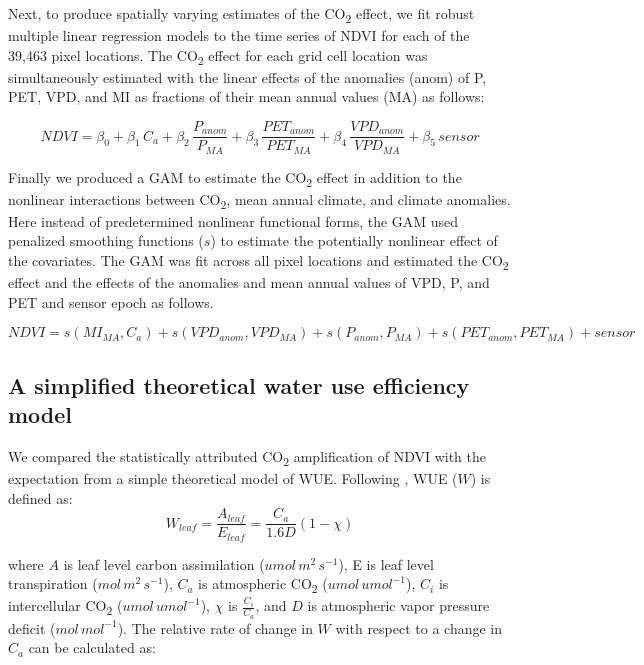 \documentclass[gc, manuscript]{copernicus}
\begin{document}
Next, to produce spatially varying estimates of the CO\textsubscript{2}
effect, we fit robust multiple linear regression models to the time
series of NDVI for each of the 39,463 pixel locations. The
CO\textsubscript{2} effect for each grid cell location was
simultaneously estimated with the linear effects of the anomalies (anom)
of P, PET, VPD, and MI as fractions of their mean annual values (MA) as
follows:

\begin{equation}
NDVI=\beta_0+ \beta_1\,C_{a}+\beta_2\,\frac{P_{anom}}{P_{MA}}+\beta_3\,\frac{PET_{anom}}{PET_{MA}}+\beta_4\,\frac{VPD_{anom}}{{VPD_{MA}}}+\beta_5\,sensor
\end{equation}

Finally we produced a GAM to estimate the CO\textsubscript{2} effect in
addition to the nonlinear interactions between CO\textsubscript{2}, mean
annual climate, and climate anomalies. Here instead of predetermined
nonlinear functional forms, the GAM used penalized smoothing functions
(\(s\)) to estimate the potentially nonlinear effect of the covariates.
The GAM was fit across all pixel locations and estimated the
CO\textsubscript{2} effect and the effects of the anomalies and mean
annual values of VPD, P, and PET and sensor epoch as follows.

\begin{equation}
NDVI = s(MI_{MA},C_{a}) + s(VPD_{anom},VPD_{MA})+s(P_{anom},P_{MA})+s(PET_{anom},PET_{MA})+sensor
\end{equation}

\subsection{A simplified theoretical water use efficiency model}

We compared the statistically attributed CO\textsubscript{2}
amplification of NDVI with the expectation from a simple theoretical
model of WUE. Following \citet{donohueImpactCOFertilization2013b}, WUE
(\(W\)) is defined as: \begin{equation}
W_{leaf} = \frac{A_{leaf}}{E_{leaf}} = \frac{C_a}{1.6D}(1 - \chi)
\end{equation}

where \(A\) is leaf level carbon assimilation (\(umol\,m^{2}\,s^{-1}\)),
E is leaf level transpiration (\(mol\,m^{2}\,s^{-1}\)), \(C_a\) is
atmospheric CO\textsubscript{2} (\(umol\,umol^{-1}\)), \(C_i\) is
intercellular CO\textsubscript{2} (\(umol\,umol^{-1}\)), \(\chi\) is
\(\frac{C_i}{C_a}\), and \(D\) is atmospheric vapor pressure deficit
(\(mol\,mol^{-1}\)). The relative rate of change in \(W\) with respect
to a change in \(C_a\) can be calculated as:
\end{document}
